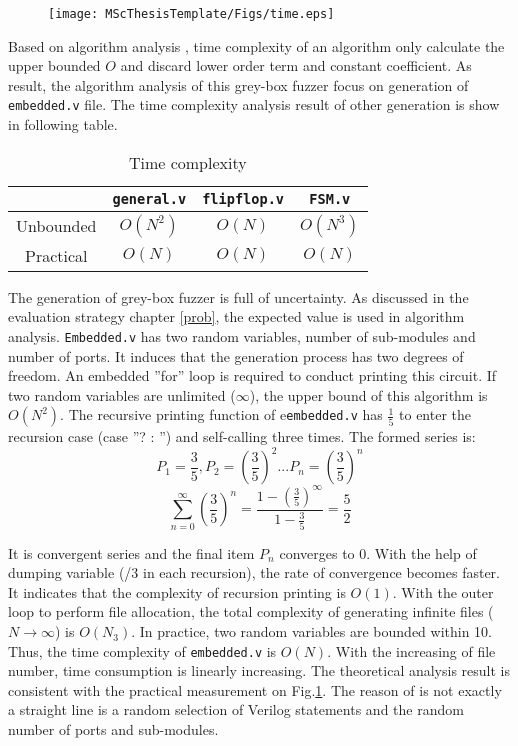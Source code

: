 \begin{figure}[htbp]
\centering
\label{Fig.sub.1}
\texttt{[image: MScThesisTemplate/Figs/time.eps]}
\end{figure}
Based on algorithm analysis \cite{allen2007data}, time complexity of an algorithm only calculate the upper bounded $O$ and discard lower order term and constant coefficient. As result, the algorithm analysis of this grey-box fuzzer focus on generation of \texttt{embedded.v} file. The time complexity analysis result of other generation is show in following table.
\begin{table}[htbp]
    \centering
    \begin{tabular}{c|c|c|c}
    \hline
         &  \texttt{general.v}&\texttt{flipflop.v}&\texttt{FSM.v}\\
    \hline
         Unbounded&$O(N^2)$&$O(N)$&$O(N^3)$\\
\hline
         Practical&$O(N)$&$O(N)$&$O(N)$\\
         \hline
    \end{tabular}
    \caption{Time complexity}
    \label{tab:tc}
\end{table}
The generation of grey-box fuzzer is full of uncertainty. As discussed in the evaluation strategy chapter \ref{prob}, the expected value is used in algorithm analysis. \texttt{Embedded.v} has two random variables, number of sub-modules and number of ports. It induces that the generation process has two degrees of freedom. An embedded ''for'' loop is required to conduct printing this circuit. If two random variables are unlimited ($\infty$), the upper bound of this algorithm is $O(N^{2})$. The recursive printing function of e\texttt{embedded.v} has $\frac{1}{5}$ to enter the recursion case (case ''? : '') and self-calling three times. The formed series is:
\begin{equation}
P_{1}=\frac{3}{5}, P_{2}=(\frac{3}{5})^2...P_{n}=(\frac{3}{5})^n
\end{equation}
\begin{equation}
\sum_{n=0}^{\infty}(\frac{3}{5})^{n} = \frac{1-(\frac{3}{5})^\infty}{1-\frac{3}{5}} = \frac{5}{2}
\end{equation}

It is convergent series and the final item $P_{n}$ converges to 0. With the help of dumping variable (/3 in each recursion), the rate of convergence becomes faster. It indicates that the complexity of recursion printing is $O(1)$. With the outer loop to perform file allocation, the total complexity of generating infinite files ($N \to\infty$) is $O(N_{3})$. In practice, two random variables are bounded within 10. Thus, the time complexity of \texttt{embedded.v} is $O(N)$. With the increasing of file number, time consumption is linearly increasing. The theoretical analysis result is consistent with the practical measurement on Fig.\ref{Fig.sub.1}. The reason of is not exactly a straight line is a random selection of Verilog statements and the random number of ports and sub-modules.

